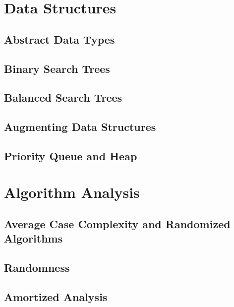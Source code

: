 \documentclass[11pt,fleqn,dvipsnames]{book} %
\begin{document}
\part{Data Structures}

\chapter{Abstract Data Types}


\chapter{Binary Search Trees}


\chapter{Balanced Search Trees}





\chapter{Augmenting Data Structures}


\chapter{Priority Queue and Heap}



\part{Algorithm Analysis}

\chapter{Average Case Complexity and Randomized Algorithms}


\chapter{Randomness}


\chapter{Amortized Analysis}

\end{document}
